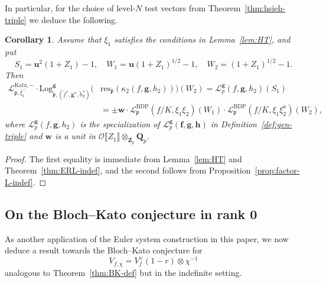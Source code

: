 \documentclass[10pt,letterpaper]{amsart}
\theoremstyle{plain}
\theoremstyle{definition}
\theoremstyle{definition}
\theoremstyle{plain}
\theoremstyle{plain}
\theoremstyle{plain}
\newtheorem{cor}[thm]{Corollary}
\theoremstyle{remark}
\numberwithin{equation}{section}
\newcommand{\cc}{\mathbf{c}}
\newcommand{\ch}{\xi}
\newcommand{\pp}{\mathfrak{p}}
\newcommand{\ppbar}{\bar{\mathfrak{p}}}
\DeclareMathOperator{\BDP}{BDP} %
\def\cO{\mathcal O}
\newcommand{\Q}{\mathbf{Q}}
\newcommand{\Z}{\mathbf{Z}}
\newcommand{\dBr}[1]{\llbracket{#1}\rrbracket}
\newcommand{\bff}{{\boldsymbol{f}}}
\newcommand{\bfg}{{\boldsymbol{g}}}
\newcommand{\bfh}{{\boldsymbol{h}}}
\begin{document}
In particular, for the choice of level-$N$ test vectors from Theorem~\ref{thm:hsieh-triple} we deduce the following.

\begin{cor}\label{cor:ERL-indef}
Assume that $\ch_1$ satisfies the conditions in Lemma~\ref{lem:HT}, and put
\[
S_1=\mathbf{u}^2(1+Z_1)-1,\quad 
W_1=\mathbf{u}(1+Z_1)^{1/2}-1,\quad
W_2=(1+Z_1)^{1/2}-1.
\]
Then 
\begin{align*}
\mathcal{L}_{\pp,\bar{\xi}_1^-}^{{\mathrm{Katz}},-}\cdot{\mathrm{Log}}^\bfg_{\ppbar,(\breve{f}^\star,\breve{\bfg}^\star,\breve{h}_2^\star)}\bigl(&{\mathrm{res}}_{\ppbar}(\kappa_2(f,\bfg,h_2))\bigr)(W_2)=\mathscr{L}_p^\bfg(f,\bfg,h_2)(S_1)\\
&=\pm\mathbf{w}\cdot\mathscr{L}_\pp^{\BDP}(f/K,\xi_1\xi_2)(W_1)\cdot\mathscr{L}_\pp^{\BDP}(f/K,\xi_1\xi_2^\cc)(W_2),
\end{align*}
where $\mathscr{L}_p^{\bfg}(f,\bfg,h_2)$ is the specialization of $\mathscr{L}_p^\bfg(\bff,\bfg,\bfh)$ in Definition~\ref{def:gen-triple} and $\mathbf{w}$ is a unit in $\cO\dBr{Z_1}\otimes_{\Z_p}\Q_p$.
\end{cor}

\begin{proof}
The first equality is immediate from Lemma~\ref{lem:HT} and Theorem~\ref{thm:ERL-indef}, and the second follows from  Proposition~\ref{prop:factor-L-indef}.
\end{proof}

\subsection{On the Bloch--Kato conjecture in rank 0}
\label{subsec:BK-indef}

As another application of the Euler system construction in this paper, we now deduce a result towards the Bloch--Kato conjecture for  
\[
V_{f,\chi}=V_f^\vee(1-r)\otimes\chi^{-1}
\]
analogous to Theorem~\ref{thm:BK-def} but in the indefinite setting. 
\end{document}

